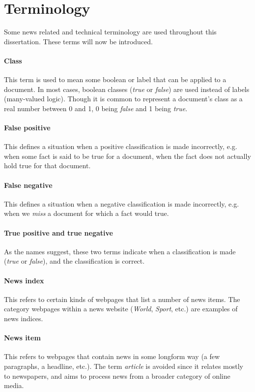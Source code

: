 \section{Terminology}

Some news related and technical terminology are used throughout this
dissertation.  These terms will now be introduced.

\paragraph{Class} This term is used to mean some boolean or label
that can be applied to a document.  In most cases, boolean classes
({\it true} or {\it false}) are used instead of labels (many-valued
logic).  Though it is common to represent a document's class as a
real number between 0 and 1, 0 being {\it false} and 1 being
{\it true}.
\paragraph{False positive}
This defines a situation when a positive classification is made
incorrectly, e.g. when some fact is said to be true for a document,
when the fact does not actually hold true for that document.
\paragraph{False negative}
This defines a situation when a negative classification is made
incorrectly, e.g. when we {\it miss} a document for which a fact
would true.
\paragraph{True positive and true negative} As the names suggest, these
two terms indicate when a classification is made ({\it true} or
{\it false}), and the classification is correct.
\paragraph{News index}  This refers to certain kinds of webpages
that list a number of news items.  The category webpages within a
news website ({\it World}, {\it Sport}, etc.) are examples of
news indices.
\paragraph{News item}  This refers to webpages that contain news in
some longform way (a few paragraphs, a headline, etc.). 
The term {\it article} is avoided since it relates mostly to newspapers,
and \nr{} aims to process news from a broader category of online media.
